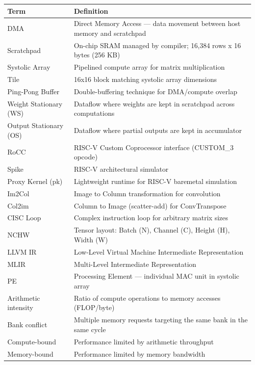 \documentclass[12pt,a4paper]{article}
\begin{document}
\begin{longtable}{|p{}|p{}|}
\hline
\textbf{Term} & \textbf{Definition} \\
\hline
DMA & Direct Memory Access --- data movement between host memory and scratchpad \\
\hline
Scratchpad & On-chip SRAM managed by compiler; 16,384 rows x 16 bytes (256 KB) \\
\hline
Systolic Array & Pipelined compute array for matrix multiplication \\
\hline
Tile & 16x16 block matching systolic array dimensions \\
\hline
Ping-Pong Buffer & Double-buffering technique for DMA/compute overlap \\
\hline
Weight Stationary (WS) & Dataflow where weights are kept in scratchpad across computations \\
\hline
Output Stationary (OS) & Dataflow where partial outputs are kept in accumulator \\
\hline
RoCC & RISC-V Custom Coprocessor interface (CUSTOM\_3 opcode) \\
\hline
Spike & RISC-V architectural simulator \\
\hline
Proxy Kernel (pk) & Lightweight runtime for RISC-V baremetal simulation \\
\hline
Im2Col & Image to Column transformation for convolution \\
\hline
Col2im & Column to Image (scatter-add) for ConvTranspose \\
\hline
CISC Loop & Complex instruction loop for arbitrary matrix sizes \\
\hline
NCHW & Tensor layout: Batch (N), Channel (C), Height (H), Width (W) \\
\hline
LLVM IR & Low-Level Virtual Machine Intermediate Representation \\
\hline
MLIR & Multi-Level Intermediate Representation \\
\hline
PE & Processing Element --- individual MAC unit in systolic array \\
\hline
Arithmetic intensity & Ratio of compute operations to memory accesses (FLOP/byte) \\
\hline
Bank conflict & Multiple memory requests targeting the same bank in the same cycle \\
\hline
Compute-bound & Performance limited by arithmetic throughput \\
\hline
Memory-bound & Performance limited by memory bandwidth \\

\end{longtable}
\end{document}

